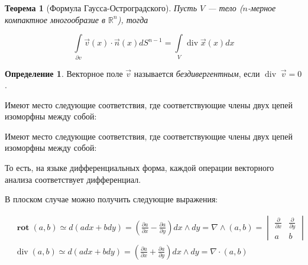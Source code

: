 \documentclass[a5paper]{article}
\newcounter{through}
\theoremstyle{plain}
\newtheorem{theorem}[through]{Теорема}
\theoremstyle{definition}
\newtheorem{definition}[through]{Определение}
\numberwithin{through}{section}
\numberwithin{equation}{section}
\DeclareMathOperator{\rot}{\textbf{rot}}
\DeclareMathOperator{\grad}{grad}
\DeclareMathOperator{\diver}{div}
\begin{document}
\begin{theorem}[Формула Гаусса-Остроградского]
	Пусть $V$ --- тело ($n$-мерное компактное многообразие в $\mathbb{R}^n$), тогда 
	
	\begin{equation*}
		\int\limits_{\partial v} \vec{v}(x) \cdot \vec{n}(x) d S^{n-1} = \int\limits_{V} \diver \vec{x}(x) dx 
	\end{equation*}
\end{theorem}

\begin{definition}
	Векторное поле $\vec{v}$ называется \textit{бездивергентным}, если $\diver \; \vec{v} = 0$.
\end{definition}


Имеют место следующие соответствия, где соответствующие члены двух цепей изоморфны между собой:
\begin{center}
\end{center}


Имеют место следующие соответствия, где соответствующие члены двух цепей изоморфны между собой:


То есть, на языке дифференциальных форма, каждой операции векторного анализа соответствует дифференциал. 

В плоском случае можно получить следующие выражения:

\begin{align*}
	& \rot (a, b) \simeq d (adx + bdy) = \left(\frac{\partial a}{\partial x} - \frac{\partial a}{\partial y}\right)  dx \wedge dy = \nabla \wedge (a, b) =
	\begin{vmatrix}
		\frac{\partial}{\partial x} & \frac{\partial}{\partial y} \\
		a & b
	\end{vmatrix} \\
	&\diver (a, b) \simeq d(adx + bdy) = \left(\frac{\partial a}{\partial x} + \frac{\partial a}{\partial y}\right)  dx \wedge dy = \nabla \cdot (a, b)
\end{align*}
\end{document}
